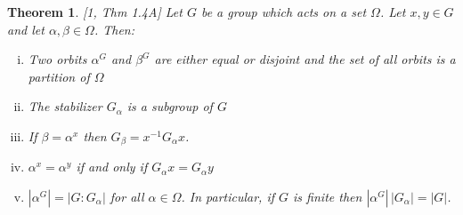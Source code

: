 \documentclass[]{article}
\newtheorem{thm}{Theorem}[section]
\theoremstyle{definition}
\begin{document}
\begin{thm} \label{thm:orbits} \emph{[1, Thm 1.4A]}
	Let $G$ be a group which acts on a set $\Omega$. Let $x,y \in G$ and let $\alpha, \beta \in \Omega$. Then:
\begin{enumerate}[(i)]
\item Two orbits $\alpha^G$ and $\beta^G$ are either equal or disjoint and the set of all orbits is a partition of $\Omega$
\vspace{-0.2cm} \item The stabilizer $G_\alpha$ is a subgroup of $G$
\vspace{-0.2cm} \item If $\beta = \alpha^x$ then $G_\beta = x^{-1} G_\alpha x$.
\vspace{-0.2cm} \item $\alpha^x = \alpha^y$ if and only if $G_\alpha x = G_\alpha y$
\vspace{-0.2cm} \item $|\alpha^G| = |G : G_\alpha|$ for all $\alpha \in \Omega$. In particular, if $G$ is finite then $|\alpha^G| \, |G_\alpha| = |G|$.
\end{enumerate}
\end{thm}
\end{document}
